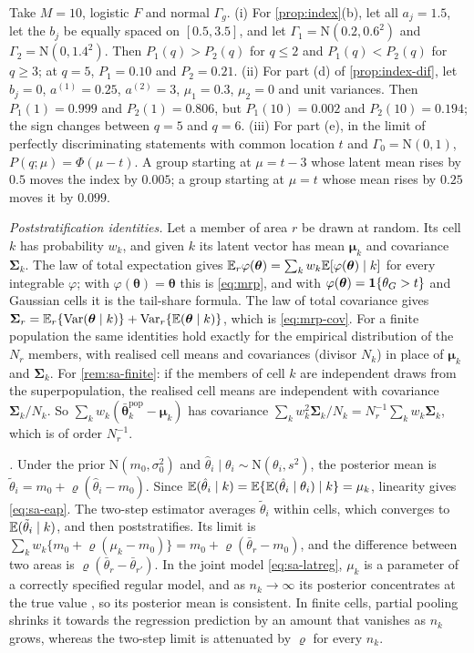\begin{example}\label{ex:sa-index}
Take $M=10$, logistic $F$ and normal $\Gamma_g$. (i) For \cref{prop:index}(b), let all $a_j=1.5$, let the $b_j$ be equally spaced on $[0.5,3.5]$, and let $\Gamma_1=\mathrm N(0.2,0.6^2)$ and $\Gamma_2=\mathrm N(0,1.4^2)$. Then $P_1(q)>P_2(q)$ for $q\le2$ and $P_1(q)<P_2(q)$ for $q\ge3$; at $q=5$, $P_1=0.10$ and $P_2=0.21$. (ii) For part (d) of \cref{prop:index-dif}, let $b_j=0$, $a^{(1)}=0.25$, $a^{(2)}=3$, $\mu_1=0.3$, $\mu_2=0$ and unit variances. Then $P_1(1)=0.999$ and $P_2(1)=0.806$, but $P_1(10)=0.002$ and $P_2(10)=0.194$; the sign changes between $q=5$ and $q=6$. (iii) For part (e), in the limit of perfectly discriminating statements with common location $t$ and $\Gamma_0=\mathrm N(0,1)$, $P(q;\mu)=\Phi(\mu-t)$. A group starting at $\mu=t-3$ whose latent mean rises by $0.5$ moves the index by $0.005$; a group starting at $\mu=t$ whose mean rises by $0.25$ moves it by $0.099$.
\end{example}

\emph{Poststratification identities.} Let a member of area $r$ be drawn at random. Its cell $k$ has probability $w_k$, and given $k$ its latent vector has mean $\bm\mu_k$ and covariance $\bm\Sigma_k$. The law of total expectation gives $\mathbb{E}_r\varphi(\bm\theta)=\sum_kw_k\mathbb{E}[\varphi(\bm\theta)\mid k]$ for every integrable $\varphi$; with $\varphi(\bm\theta)=\bm\theta$ this is \eqref{eq:mrp}, and with $\varphi(\bm\theta)=\mathbf{1}\!\left\{\theta_G>t\right\}$ and Gaussian cells it is the tail-share formula. The law of total covariance gives $\bm\Sigma_r=\mathbb{E}_r\{\operatorname{Var}(\bm\theta\mid k)\}+\operatorname{Var}_r\{\mathbb{E}(\bm\theta\mid k)\}$, which is \eqref{eq:mrp-cov}. For a finite population the same identities hold exactly for the empirical distribution of the $N_r$ members, with realised cell means and covariances (divisor $N_k$) in place of $\bm\mu_k$ and $\bm\Sigma_k$. For \cref{rem:sa-finite}: if the members of cell $k$ are independent draws from the superpopulation, the realised cell means are independent with covariance $\bm\Sigma_k/N_k$. So $\sum_kw_k(\bar{\bm\theta}^{\mathrm{pop}}_k-\bm\mu_k)$ has covariance $\sum_kw_k^2\bm\Sigma_k/N_k=N_r^{-1}\sum_kw_k\bm\Sigma_k$, which is of order $N_r^{-1}$.

\emph{.} Under the prior $\mathrm N(m_0,\sigma_0^2)$ and $\hat\theta_i\mid\theta_i\sim\mathrm N(\theta_i,s^2)$, the posterior mean is $\tilde\theta_i=m_0+\varrho(\hat\theta_i-m_0)$. Since $\mathbb{E}(\hat\theta_i\mid k)=\mathbb{E}\{\mathbb{E}(\hat\theta_i\mid\theta_i)\mid k\}=\mu_k$, linearity gives \eqref{eq:sa-eap}. The two-step estimator averages $\tilde\theta_i$ within cells, which converges to $\mathbb{E}(\tilde\theta_i\mid k)$, and then poststratifies. Its limit is $\sum_kw_k\{m_0+\varrho(\mu_k-m_0)\}=m_0+\varrho(\bar\theta_r-m_0)$, and the difference between two areas is $\varrho(\bar\theta_r-\bar\theta_{r'})$. In the joint model \eqref{eq:sa-latreg}, $\mu_k$ is a parameter of a correctly specified regular model, and as $n_k\to\infty$ its posterior concentrates at the true value \citep[ch.~10]{vandervaart1998}, so its posterior mean is consistent. In finite cells, partial pooling shrinks it towards the regression prediction by an amount that vanishes as $n_k$ grows, whereas the two-step limit is attenuated by $\varrho$ for every $n_k$.

